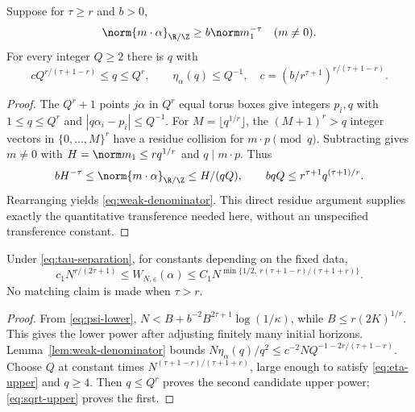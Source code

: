 \begin{lemma}\label{lem:weak-denominator}
Suppose for $\tau\ge r$ and $b>0$,
\begin{equation}\label{eq:tau-separation}
        \norm{m\cdot\alpha}_{\R/\Z}\ge b\norm m_1^{-\tau}
                         \quad(m\ne0).
\end{equation}
For every integer $Q\ge2$ there is $q$ with
\begin{equation}\label{eq:weak-denominator}
 cQ^{r/(\tau+1-r)}\le q\le Q^r,
 \qquad\eta_\alpha(q)\le Q^{-1},
 \quad c=(b/r^{\tau+1})^{r/(\tau+1-r)}.
\end{equation}
\end{lemma}
\begin{proof}
The $Q^r+1$ points $j\alpha$ in $Q^r$ equal torus boxes give integers $p_i,q$ with $1\le q\le Q^r$ and $|q\alpha_i-p_i|\le Q^{-1}$. For $M=\lfloor q^{1/r}\rfloor$, the $(M+1)^r>q$ integer vectors in $\{0,\ldots,M\}^r$ have a residue collision for $m\cdot p\pmod q$. Subtracting gives $m\ne0$ with $H=\norm m_1\le r q^{1/r}$ and $q\mid m\cdot p$. Thus
\[
 bH^{-\tau}\le\norm{m\cdot\alpha}_{\R/\Z}\le H/(qQ),
 \qquad bqQ\le r^{\tau+1}q^{(\tau+1)/r}.
\]
Rearranging yields \eqref{eq:weak-denominator}. This direct residue argument supplies exactly the quantitative transference needed here, without an unspecified transference constant.
\end{proof}

\begin{corollary}\label{cor:power-type}
Under \eqref{eq:tau-separation}, for constants depending on the fixed data,
\begin{equation}\label{eq:power-bracket}
 c_1N^{r/(2\tau+1)}\le W_{N,\varepsilon}(\alpha)
 \le C_1N^{\min\{1/2,\ r(\tau+1-r)/(\tau+1+r)\}}.
\end{equation}
No matching claim is made when $\tau>r$.
\end{corollary}
\begin{proof}
From \eqref{eq:psi-lower},
$N<B+b^{-2}B^{2\tau+1}\log(1/\kappa)$, while $B\le r(2K)^{1/r}$. This gives the lower power after adjusting finitely many initial horizons. Lemma~\ref{lem:weak-denominator} bounds
$N\eta_\alpha(q)/q^2\le c^{-2}NQ^{-1-2r/(\tau+1-r)}$.
Choose $Q$ at constant times $N^{(\tau+1-r)/(\tau+1+r)}$, large enough to satisfy \eqref{eq:eta-upper} and $q\ge4$. Then $q\le Q^r$ proves the second candidate upper power; \eqref{eq:sqrt-upper} proves the first.
\end{proof}

